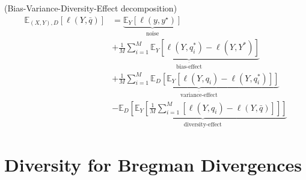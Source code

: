 \documentclass[../main.tex]{subfiles}
\begin{document}
\begin{theorem} (Bias-Variance-Diversity-Effect decomposition)
\begin{align*}
    \mathbb{E}_{(X,Y),D}\left[ \ell(Y, \bar{q}) \right] &= 
    \underbrace{ \mathbb{E}_{Y}\left[ \ell(y, y^\star) \right] }_{\text{noise}} \\
    &+
    \underbrace{
        \frac{1}{M} \sum_{i=1}^M \mathbb{E}_Y\left[\ell\left(Y, q_i^*\right)-\ell\left(Y, Y^*\right)\right]
    }_{\overline{\text{bias-effect}}} \\
    &+
    \underbrace{
        \frac{1}{M} \sum_{i=1}^M \mathbb{E}_D\left[\mathbb{E}_Y\left[\ell\left(Y, q_i\right)-\ell\left(Y, q_i^*\right)\right]\right]
    }_{\overline{\text{variance-effect}}} \\
    &- %
    \underbrace{
    \mathbb{E}_D\left[\mathbb{E}_Y\left[\frac{1}{M} \sum_{i=1}^M\left[\ell\left(Y, q_i\right)-\ell(Y, \bar{q})\right]\right]\right]
    }_{\text{diversity-effect}}
\end{align*}
\end{theorem}








\section{Diversity for Bregman Divergences} \label{sec:bregman-divergences}

\end{document}
